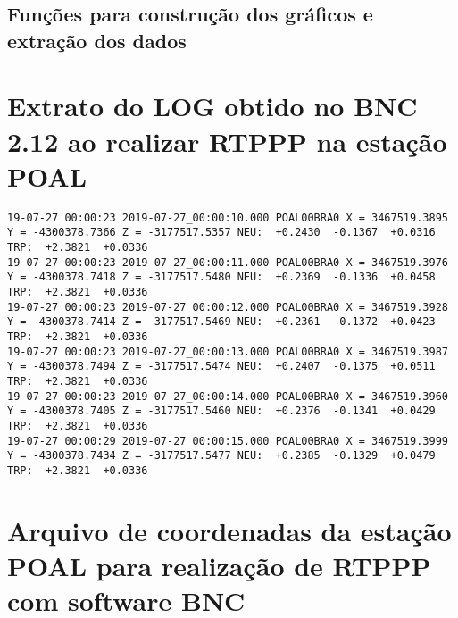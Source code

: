 \subsection{Funções para construção dos gráficos e extração dos dados}


\section{Extrato do LOG obtido no BNC 2.12 ao realizar RTPPP na estação POAL}

\begin{lstlisting}
19-07-27 00:00:23 2019-07-27_00:00:10.000 POAL00BRA0 X = 3467519.3895 Y = -4300378.7366 Z = -3177517.5357 NEU:  +0.2430  -0.1367  +0.0316 TRP:  +2.3821  +0.0336
19-07-27 00:00:23 2019-07-27_00:00:11.000 POAL00BRA0 X = 3467519.3976 Y = -4300378.7418 Z = -3177517.5480 NEU:  +0.2369  -0.1336  +0.0458 TRP:  +2.3821  +0.0336
19-07-27 00:00:23 2019-07-27_00:00:12.000 POAL00BRA0 X = 3467519.3928 Y = -4300378.7414 Z = -3177517.5469 NEU:  +0.2361  -0.1372  +0.0423 TRP:  +2.3821  +0.0336
19-07-27 00:00:23 2019-07-27_00:00:13.000 POAL00BRA0 X = 3467519.3987 Y = -4300378.7494 Z = -3177517.5474 NEU:  +0.2407  -0.1375  +0.0511 TRP:  +2.3821  +0.0336
19-07-27 00:00:23 2019-07-27_00:00:14.000 POAL00BRA0 X = 3467519.3960 Y = -4300378.7405 Z = -3177517.5460 NEU:  +0.2376  -0.1341  +0.0429 TRP:  +2.3821  +0.0336
19-07-27 00:00:29 2019-07-27_00:00:15.000 POAL00BRA0 X = 3467519.3999 Y = -4300378.7434 Z = -3177517.5477 NEU:  +0.2385  -0.1329  +0.0479 TRP:  +2.3821  +0.0336
\end{lstlisting}
\section{Arquivo de coordenadas da estação POAL para realização de RTPPP com software BNC}







